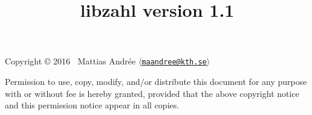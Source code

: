 \documentclass[11pt,b5paper,openright,fleqn]{book}
\begin{document}
\frontmatter

\title{{\Huge \bf libzahl version 1.1}}
\author{}
\date{\vspace{3in}}
\maketitle

\thispagestyle{empty}
\null
\vfill
\noindent
Copyright \copyright{} 2016 $~$  Mattias Andrée $\langle$\href{mailto:maandree@kth.se}{\texttt{maandree@kth.se}}$\rangle$
\vspace{1ex}

\noindent
{\small
Permission to use, copy, modify, and/or distribute this document for any
purpose with or without fee is hereby granted, provided that the above
copyright notice and this permission notice appear in all copies.}
\newpage




\setcounter{tocdepth}{2}
\dominitoc
\tableofcontents


\mainmatter












\appendix


\backmatter

\printindex
\end{document}
